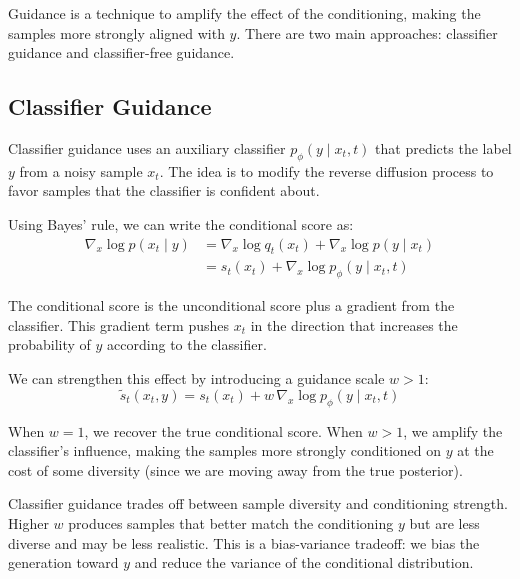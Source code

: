\vspPara

Guidance is a technique to amplify the effect of the conditioning, making the samples more strongly aligned with $y$. There are two main approaches: classifier guidance and classifier-free guidance.

\vspSection

\subsection{Classifier Guidance}

Classifier guidance uses an auxiliary classifier $p_\phi(y \mid x_t, t)$ that predicts the label $y$ from a noisy sample $x_t$. The idea is to modify the reverse diffusion process to favor samples that the classifier is confident about.

\vspPara

Using Bayes' rule, we can write the conditional score as:
%
\begin{align}
\nabla_x \log p(x_t \mid y) &= \nabla_x \log q_t(x_t) + \nabla_x \log p(y \mid x_t) \\
&= s_t(x_t) + \nabla_x \log p_\phi(y \mid x_t, t)
\end{align}

\vspPara

The conditional score is the unconditional score plus a gradient from the classifier. This gradient term pushes $x_t$ in the direction that increases the probability of $y$ according to the classifier.

\vspPara

We can strengthen this effect by introducing a guidance scale $w > 1$:
%
\begin{equation}
\tilde{s}_t(x_t, y) = s_t(x_t) + w \, \nabla_x \log p_\phi(y \mid x_t, t)
\end{equation}

\vspPara

When $w = 1$, we recover the true conditional score. When $w > 1$, we amplify the classifier's influence, making the samples more strongly conditioned on $y$ at the cost of some diversity (since we are moving away from the true posterior).

\vspSection

\begin{keyinsight}
Classifier guidance trades off between sample diversity and conditioning strength. Higher $w$ produces samples that better match the conditioning $y$ but are less diverse and may be less realistic. This is a bias-variance tradeoff: we bias the generation toward $y$ and reduce the variance of the conditional distribution.
\end{keyinsight}

